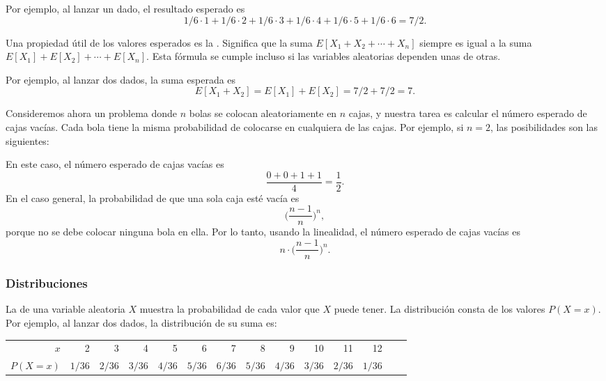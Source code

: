 Por ejemplo, al lanzar un dado,
el resultado esperado es
\[1/6 \cdot 1 + 1/6 \cdot 2 + 1/6 \cdot 3 + 1/6 \cdot 4 + 1/6 \cdot 5 + 1/6 \cdot 6 = 7/2.\]

Una propiedad útil de los valores esperados es la .
Significa que la suma
$E[X_1+X_2+\cdots+X_n]$
siempre es igual a la suma
$E[X_1]+E[X_2]+\cdots+E[X_n]$.
Esta fórmula se cumple incluso si las variables aleatorias
dependen unas de otras.

Por ejemplo, al lanzar dos dados,
la suma esperada es
\[E[X_1+X_2]=E[X_1]+E[X_2]=7/2+7/2=7.\]

Consideremos ahora un problema donde
$n$ bolas se colocan aleatoriamente en $n$ cajas,
y nuestra tarea es calcular el número esperado
de cajas vacías.
Cada bola tiene la misma probabilidad de
colocarse en cualquiera de las cajas.
Por ejemplo, si $n=2$, las posibilidades
son las siguientes:
\begin{center}
\end{center}
En este caso, el número esperado de
cajas vacías es
\[\frac{0+0+1+1}{4} = \frac{1}{2}.\]
En el caso general, la probabilidad de que una
sola caja esté vacía es
\[\Big(\frac{n-1}{n}\Big)^n,\]
porque no se debe colocar ninguna bola en ella.
Por lo tanto, usando la linealidad, el número esperado de
cajas vacías es
\[n \cdot \Big(\frac{n-1}{n}\Big)^n.\]

\subsubsection{Distribuciones}


La  de una variable aleatoria $X$
muestra la probabilidad de cada valor que
$X$ puede tener.
La distribución consta de los valores $P(X=x)$.
Por ejemplo, al lanzar dos dados,
la distribución de su suma es:
\begin{center}
\small {
\begin{tabular}{r|rrrrrrrrrrrrr}
$x$ & 2 & 3 & 4 & 5 & 6 & 7 & 8 & 9 & 10 & 11 & 12 \\
$P(X=x)$ & $1/36$ & $2/36$ & $3/36$ & $4/36$ & $5/36$ & $6/36$ & $5/36$ & $4/36$ & $3/36$ & $2/36$ & $1/36$ \\
\end{tabular}
}
\end{center}

